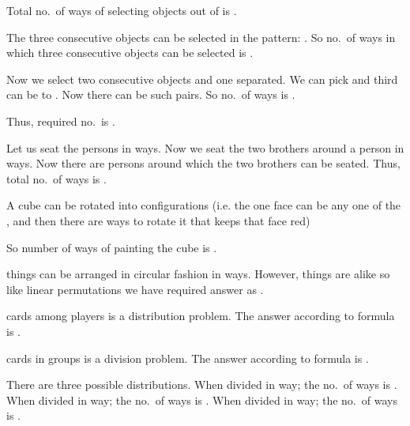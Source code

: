   Total no.\ of ways of selecting  objects out of  is .

  The three consecutive objects can be selected in the pattern: . So no.\ of ways in which three consecutive objects can be selected is .

  Now we select two consecutive objects and one separated. We can pick  and third can be 
  to . Now there can be  such pairs. So no.\ of ways is .

  Thus, required no.\ is .
\item Let us seat the  persons in  ways. Now we seat the two brothers around a person in 
  ways. Now there are  persons around which the two brothers can be seated. Thus, total no.\ of ways
  is .
\item A cube can be rotated into  configurations (i.e. the one face can be any one of the
  , and then there are  ways to rotate it that keeps that face red)

  So number of ways of painting the cube is .
\item {} things can be arranged in circular fashion in  ways. However,  things are alike
  so like linear permutations we have required answer as .
\item {} cards among  players is a distribution problem. The answer according to formula is
  .

   cards in  groups is a division problem. The answer according to formula is
  .
\item There are three possible distributions. When divided in  way; the no.\ of ways is
  . When divided in  way; the no.\ of ways is
  . When divided in  way; the no.\ of ways is
  .

